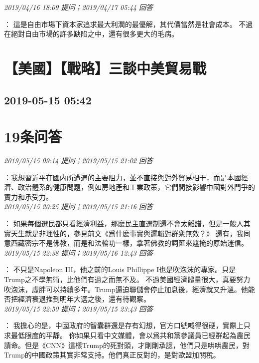 \documentclass[twocolumn]{ctexart}
\begin{document}
\textit{\hfill\noindent\small 2019/04/16 18:09 提问；2019/04/17 05:44 回答}

：
這是自由市場下資本家追求最大利潤的最優解，其代價當然是社會成本。
不過在絕對自由市場的許多缺陷之中，還有很多更大的毛病。
\\


\section{【美國】【戰略】三談中美貿易戰}
\subsection{2019-05-15 05:42}


\section{19条问答}

\textit{\hfill\noindent\small 2019/05/15 09:14 提问；2019/05/15 21:02 回答}

：我想習近平在國内所遭遇的主要阻力，並不直接與對外貿易相干，而是本國經濟、政治體系的健康問題，例如房地產和工業政策，它們間接影響中國對外鬥爭的實力和承受力。
\\

\textit{\hfill\noindent\small 2019/05/15 20:25 提问；2019/05/15 21:16 回答}

：
如果每個選民都只看經濟利益，那麽民主直選制還不會太離譜，但是一般人其實天生就是非理性的，參見前文《爲什麽事實與邏輯對群衆無效？》
還有，我同意西藏密宗不是佛教，而是和法輪功一樣，拿著佛教的詞匯來遮掩的原始迷信。
\\

\textit{\hfill\noindent\small 2019/05/15 22:38 提问；2019/05/16 12:43 回答}

：
不只是Napoleon III，他之前的Louis Phillippe I也是吹泡沫的專家。只是Trump之不學無術，比他們有過之而無不及。
不過美國經濟體量很大，真要努力吹泡沫，虛胖可以持續多年。Trump逼迫聯儲會停止加息後，經濟就又升溫。他能否把經濟衰退推到明年大選之後，還有待觀察。
\\

\textit{\hfill\noindent\small 2019/05/15 22:50 提问；2019/05/15 23:43 回答}

：
我擔心的是，中國政府的智囊群還是存有幻想，官方口號喊得很硬，實際上只求最低限度的平靜。
你如果只看中文媒體，會以爲共和黨參議員已經群起為農民請命。但是《CNN》這樣Trump的死對頭，才剛剛承認，他們只是哄哄農民，對Trump的中國政策其實非常支持。他們真正反對的，是對歐盟加關稅。
\\
\end{document}
